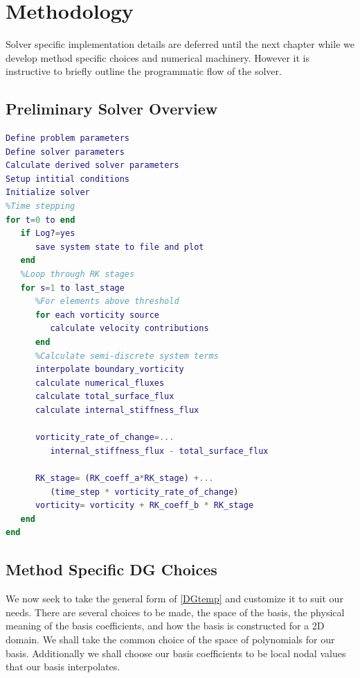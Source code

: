 \documentclass[letterpaper,12pt]{report}
\begin{document}
\chapter{Methodology}
Solver specific implementation details are deferred until the next chapter while we develop method specific choices and numerical machinery. However it is instructive to briefly outline the programmatic flow of the solver.
\section{Preliminary Solver Overview}\label{Pseudo1}
\vspace{-1cm}
\singlespacing
\begin{lstlisting}[language=Matlab]
Define problem parameters
Define solver parameters
Calculate derived solver parameters
Setup intitial conditions
Initialize solver
%Time stepping
for t=0 to end
   if Log?=yes
      save system state to file and plot
   end
   %Loop through RK stages
   for s=1 to last_stage
      %For elements above threshold
      for each vorticity source
         calculate velocity contributions
      end
      %Calculate semi-discrete system terms
      interpolate boundary_vorticity
      calculate numerical_fluxes
      calculate total_surface_flux
      calculate internal_stiffness_flux
		
      vorticity_rate_of_change=...
         internal_stiffness_flux - total_surface_flux
		
      RK_stage= (RK_coeff_a*RK_stage) +...
         (time_step * vorticity_rate_of_change)
      vorticity= vorticity + RK_coeff_b * RK_stage
   end
end
\end{lstlisting}
\doublespacing

%
\section{Method Specific DG Choices} \label{DGchoice}
We now seek to take the general form of \eqref{DGtemp} and customize it to suit our needs. There are several choices to be made, the space of the basis, the physical meaning of the basis coefficients, and how the basis is constructed for a 2D domain. We shall take the common choice of the space of polynomials for our basis. Additionally we shall choose our basis coefficients to be local nodal values that our basis interpolates.
\end{document}
